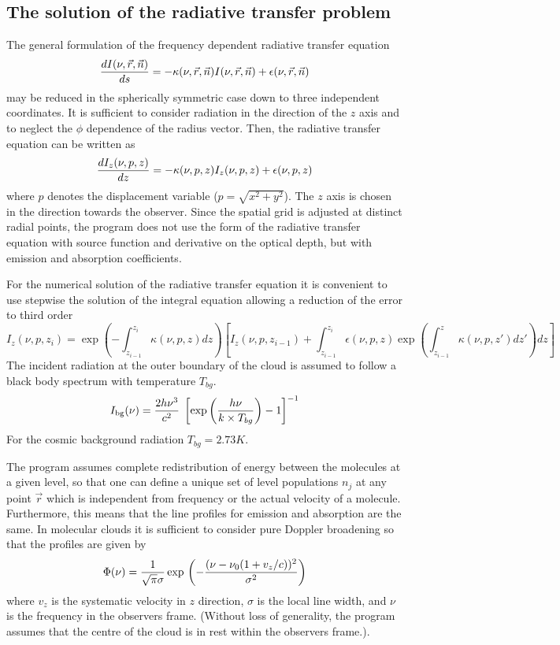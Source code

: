 \subsection{The solution of the radiative transfer problem}

The general formulation of the frequency dependent radiative transfer 
equation
\begin{equation}
{dI(\nu,\vec{r},\vec{n})\over ds} = - \kappa(\nu,\vec{r},\vec{n})
I(\nu,\vec{r},\vec{n}) + \epsilon(\nu,\vec{r},\vec{n})
\end{equation}
may be reduced in the spherically symmetric case down to three
independent coordinates. It is sufficient to consider radiation
in the direction of the $z$ axis and to neglect the $\phi$ dependence
of the radius vector. Then, the radiative transfer equation can be written 
as
\begin{equation}
{dI_z(\nu,p,z)\over dz} = -\kappa(\nu,p,z) I_z(\nu,p,z)
+ \epsilon(\nu,p,z)
\end{equation}
where $p$ denotes the displacement variable ($p=\sqrt{x^2+y^2}$).
The $z$ axis is chosen in the direction towards the observer.
Since the spatial grid is adjusted at distinct radial points,
the program does not use the form of the radiative transfer
equation with source function and derivative on the optical
depth, but with emission and absorption coefficients.

For the numerical solution of the radiative transfer equation
it is convenient to use stepwise the solution of the integral
equation allowing a reduction of the error to third order
\begin{equation}
I_z(\nu,p,z_i) = \exp \left( -\int_{z_{i-1}}^{z_i} \!\!\!
\kappa(\nu,p,z) dz \right) \left[ I_z(\nu,p,z_{i-1}) +
\int_{z_{i-1}}^{z_i} \!\!\!\epsilon(\nu,p,z) \exp \left( \int_{z_{i-1}}^z
\kappa(\nu,p,z') dz' \right) dz \right]
\label{transfer}
\end{equation}
The incident radiation at the outer boundary of the cloud is
assumed to follow a black body spectrum with temperature $T_{bg}$.
\begin{equation}
I_{\rm bg}(\nu) = {2 h \nu^3 \over c^2}\;\left[\exp \left(h \nu \over
k \times T_{bg}\right) -1\right]^{-1}
\end{equation}
For the cosmic background radiation $T_{bg}=2.73K$.

The program assumes complete redistribution of energy between
the molecules at a given level, so that one can define a unique set
of level populations $n_j$ at any point $\vec{r}$ which is independent
from frequency or the actual velocity of a molecule. Furthermore,
this means that the line profiles for emission and absorption
are the same.  In molecular clouds it is sufficient to consider
pure Doppler broadening so that the profiles are given by 
\begin{equation}
\Phi(\nu)={1 \over \sqrt{\pi} \sigma} \exp{}\left(-{(\nu-\nu_0(1+v_z/c))^2
\over \sigma^2}\right)
\label{phi}
\end{equation}
where $v_z$ is the systematic velocity in $z$ direction, $\sigma$ is the
local line width, and $\nu$ is the 
frequency in the observers frame. (Without loss of generality, the program 
assumes that the centre of the cloud is in rest within the observers frame.).

